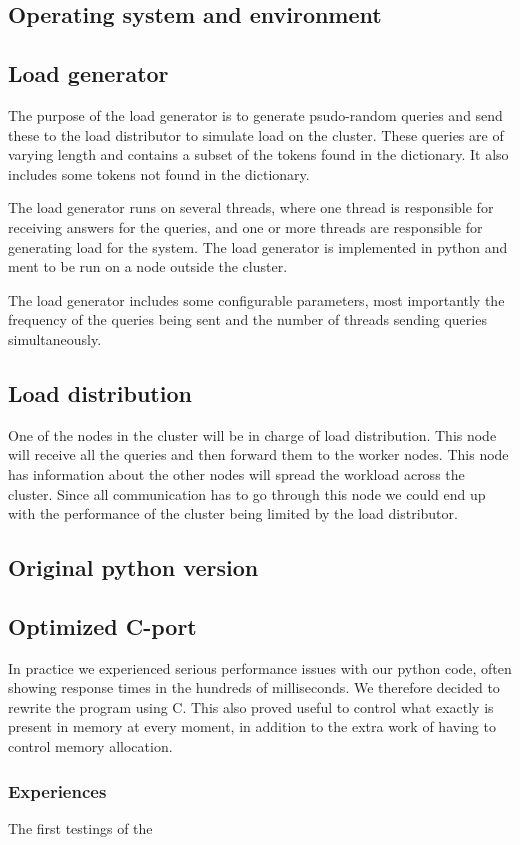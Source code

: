 \subsection{Operating system and environment}
\subsection{Load generator}
The purpose of the load generator is to generate psudo-random queries and send these to the load distributor to simulate load on the cluster. These queries are of varying length and contains a subset of the tokens found in the dictionary. It also includes some tokens not found in the dictionary.

The load generator runs on several threads, where one thread is responsible for receiving answers for the queries, and one or more threads are responsible for generating load for the system. The load generator is implemented in python and ment to be run on a node outside the cluster.

The load generator includes some configurable parameters, most importantly the frequency of the queries being sent and the number of threads sending queries simultaneously.

\subsection{Load distribution}
One of the nodes in the cluster will be in charge of load distribution. This node will receive all the queries and then forward them to the worker nodes. This node has information about the other nodes will spread the workload across the cluster. Since all communication has to go through this node we could end up with the performance of the cluster being limited by the load distributor.

\subsection{Original python version}

\subsection{Optimized C-port}
In practice we experienced serious performance issues with our python code, often showing response times in the hundreds of milliseconds. We therefore decided to rewrite the program using C. This also proved useful to control what exactly is present in memory at every moment, in addition to the extra work of having to control memory allocation.
\subsubsection{Experiences}
The first testings of the

